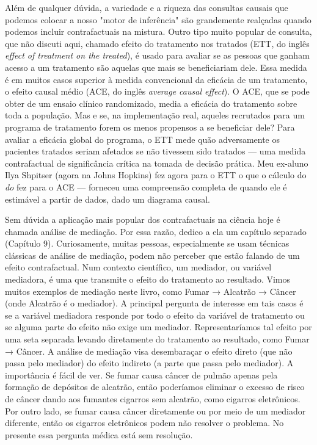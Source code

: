 \documentclass[11pt,a5paper,twoside]{book}
\begin{document}
Além de qualquer dúvida, a variedade e a riqueza das consultas causais que podemos colocar a nosso "motor de inferência" são grandemente realçadas quando podemos incluir contrafactuais na mistura. Outro tipo muito popular de consulta, que não discuti aqui, chamado efeito do tratamento nos tratados (ETT, do inglês \textit{effect of treatment on the treated}), é usado para avaliar se as pessoas que ganham acesso a um tratamento são aquelas que mais se beneficiariam dele. Essa medida é em muitos casos superior à medida convencional da eficácia de um tratamento, o efeito causal médio (ACE, do inglês \textit{average causal effect}). O ACE, que se pode obter de um ensaio clínico randomizado, media a eficácia do tratamento sobre toda a população. Mas e se, na implementação real, aqueles recrutados para um programa de tratamento forem os menos propensos a se beneficiar dele? Para avaliar a eficácia global do programa, o ETT mede quão adversamente os pacientes tratados seriam afetados se não tivessem sido tratados — uma medida contrafactual de significância crítica na tomada de decisão prática. Meu ex-aluno Ilya Shpitser (agora na Johns Hopkins) fez agora para o ETT o que o cálculo do \textit{do} fez para o ACE — forneceu uma compreensão completa de quando ele é estimável a partir de dados, dado um diagrama causal.

Sem dúvida a aplicação mais popular dos contrafactuais na ciência hoje é chamada análise de mediação. Por essa razão, dedico a ela um capítulo separado (Capítulo 9). Curiosamente, muitas pessoas, especialmente se usam técnicas clássicas de análise de mediação, podem não perceber que estão falando de um efeito contrafactual. Num contexto científico, um mediador, ou variável mediadora, é uma que transmite o efeito do tratamento ao resultado. Vimos muitos exemplos de mediação neste livro, como Fumar → Alcatrão → Câncer (onde Alcatrão é o mediador). A principal pergunta de interesse em tais casos é se a variável mediadora responde por todo o efeito da variável de tratamento ou se alguma parte do efeito não exige um mediador. Representaríamos tal efeito por uma seta separada levando diretamente do tratamento ao resultado, como Fumar → Câncer. A análise de mediação visa desembaraçar o efeito direto (que não passa pelo mediador) do efeito indireto (a parte que passa pelo mediador). A importância é fácil de ver. Se fumar causa câncer de pulmão apenas pela formação de depósitos de alcatrão, então poderíamos eliminar o excesso de risco de câncer dando aos fumantes cigarros sem alcatrão, como cigarros eletrônicos. Por outro lado, se fumar causa câncer diretamente ou por meio de um mediador diferente, então os cigarros eletrônicos podem não resolver o problema. No presente essa pergunta médica está sem resolução.
\end{document}
